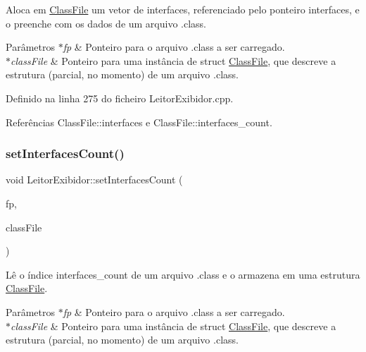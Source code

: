 Aloca em \hyperlink{classClassFile}{Class\+File} um vetor de interfaces, referenciado pelo ponteiro interfaces, e o preenche com os dados de um arquivo .class. 
\begin{DoxyParams}{Parâmetros}
{\em $\ast$fp} & Ponteiro para o arquivo .class a ser carregado. \\
\hline
{\em $\ast$class\+File} & Ponteiro para uma instância de struct \hyperlink{classClassFile}{Class\+File}, que descreve a estrutura (parcial, no momento) de um arquivo .class. \\
\hline
\end{DoxyParams}


Definido na linha 275 do ficheiro Leitor\+Exibidor.\+cpp.



Referências Class\+File\+::interfaces e Class\+File\+::interfaces\+\_\+count.

\mbox{\label{classLeitorExibidor_afbe776f3eb57a38dde0bfe862dd5650a}} 
\subsubsection{\texorpdfstring{set\+Interfaces\+Count()}{setInterfacesCount()}}
{\footnotesize\ttfamily void Leitor\+Exibidor\+::set\+Interfaces\+Count (\begin{DoxyParamCaption}\item[{F\+I\+LE $\ast$}]{fp,  }\item[{\hyperlink{classClassFile}{Class\+File} $\ast$}]{class\+File }\end{DoxyParamCaption})\hspace{0.3cm}{\ttfamily [private]}}

Lê o índice interfaces\+\_\+count de um arquivo .class e o armazena em uma estrutura \hyperlink{classClassFile}{Class\+File}. 
\begin{DoxyParams}{Parâmetros}
{\em $\ast$fp} & Ponteiro para o arquivo .class a ser carregado. \\
\hline
{\em $\ast$class\+File} & Ponteiro para uma instância de struct \hyperlink{classClassFile}{Class\+File}, que descreve a estrutura (parcial, no momento) de um arquivo .class. \\
\hline
\end{DoxyParams}


